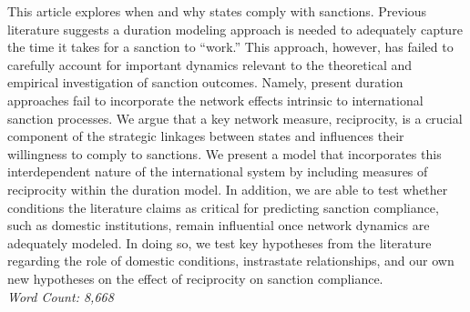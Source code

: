 This article explores when and why states comply with sanctions. Previous literature suggests a duration modeling approach is needed to adequately capture the time it takes for a sanction to ``work.'' This approach, however, has failed to carefully account for important dynamics relevant to the theoretical and empirical investigation of sanction outcomes. Namely, present duration approaches fail to incorporate the network effects intrinsic to international sanction processes. We argue that a key network measure, reciprocity, is a crucial component of the strategic linkages between states and influences their willingness to comply to sanctions. We present a model that incorporates this interdependent nature of the international system by including measures of reciprocity within the duration model. In addition, we are able to test whether conditions the literature claims as critical for predicting sanction compliance, such as domestic institutions, remain influential once network dynamics are adequately modeled. In doing so, we test key hypotheses from the literature regarding the role of domestic conditions, instrastate relationships, and our own new hypotheses on the effect of reciprocity on sanction compliance. \\

\noindent \textit{Word Count: 8,668}
